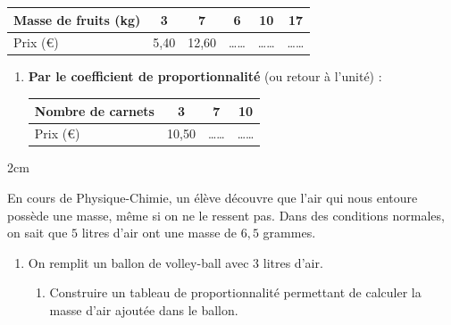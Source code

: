\documentclass[a4paper]{book}
\begin{document}
{\begin{exercice}
\begin{enumerate}
            \vspace{1.5cm}
            
            \begin{center}
            \begin{tabular}{|l|c|c|c||c|c|}
            \hline
            Masse de fruits (kg) & 3 & 7 & 6 & 10 & 17 \\ \hline
            Prix (€) & 5,40 & 12,60 & \dots\dots & \dots\dots & \dots\dots \\ \hline
            \end{tabular}
            \end{center}
        \end{enumerate}

        \vspace{2cm}
        

\newpage


        \begin{enumerate}[resume]
            \item \textbf{Par le coefficient de proportionnalité} (ou retour à l'unité) :
            \begin{center}
            \begin{tabular}{|l|c|c|c|}
            \hline
            Nombre de carnets & 3 & 7 & 10 \\ \hline
            Prix (€) & 10,50 & \dots\dots & \dots\dots \\ \hline
            \end{tabular}
            \end{center}
        \end{enumerate}
        
        \begin{ZoneReponse}{2cm}
        \end{ZoneReponse}
    \end{exercice}


    
    \begin{exercice}
        En cours de Physique-Chimie, un élève découvre que l'air qui nous entoure possède une masse, même si on ne le ressent pas. Dans des conditions normales, on sait que $5$ litres d'air ont une masse de $6,5$ grammes.
        
        \begin{enumerate}
            \item On remplit un ballon de volley-ball avec $3$ litres d'air. 
            \begin{enumerate}
                \item Construire un tableau de proportionnalité permettant de calculer la masse d'air ajoutée dans le ballon.


\end{enumerate}
\end{enumerate}
\end{exercice}}
\end{document}
